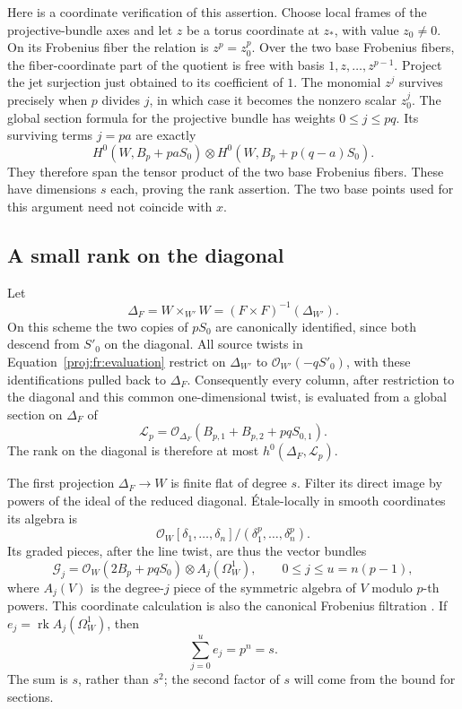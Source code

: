 \documentclass[11pt,letterpaper]{article}
\theoremstyle{definition}
\theoremstyle{remark}
\begin{document}
Here is a coordinate verification of this assertion. Choose local
frames of the projective-bundle axes and let \(z\) be a torus coordinate
at \(z_*\), with value \(z_0\ne0\). On its Frobenius fiber the relation
is \(z^p=z_0^p\). Over the two base Frobenius fibers, the fiber-coordinate
part of the quotient is free with basis \(1,z,\ldots,z^{p-1}\).
Project the jet surjection just obtained to its coefficient of \(1\).
The monomial \(z^j\) survives precisely when \(p\) divides \(j\), in
which case it becomes the nonzero scalar \(z_0^j\).
The global section formula for the projective bundle has weights
\(0\leq j\leq pq\). Its surviving terms \(j=pa\) are exactly
\[
 H^0(W,B_p+paS_0)\otimes
 H^0(W,B_p+p(q-a)S_0).
\]
They therefore span the tensor product of the two base Frobenius
fibers. These have dimensions \(s\) each, proving the rank assertion.
The two base points used for this argument need not coincide with \(x\).

\subsection{A small rank on the diagonal}

Let
\[
 \Delta_F=W\times_{W'}W=(F\times F)^{-1}(\Delta_{W'}).
\]
On this scheme the two copies of \(pS_0\) are canonically identified,
since both descend from \(S'_0\) on the diagonal. All source twists
in Equation~\eqref{proj:fr:evaluation} restrict on \(\Delta_{W'}\) to
\(\mathcal{O}_{W'}(-qS'_0)\), with these identifications pulled back to
\(\Delta_F\). Consequently every column, after restriction to
the diagonal and this common one-dimensional twist, is evaluated from a
global section on \(\Delta_F\) of
\[
 \mathcal L_p=
 \mathcal{O}_{\Delta_F}(B_{p,1}+B_{p,2}+pqS_{0,1}).
\]
The rank on the diagonal is therefore at most
\(h^0(\Delta_F,\mathcal L_p)\).

The first projection \(\Delta_F\to W\) is finite flat of degree \(s\).
Filter its direct image by powers of the ideal of the reduced
diagonal. \'{E}tale-locally in smooth coordinates its algebra is
\[
 \mathcal{O}_W[\delta_1,\ldots,\delta_n]/
                  (\delta_1^p,\ldots,\delta_n^p).
\]
Its graded pieces, after the line twist, are thus the vector bundles
\begin{equation}
\label{proj:fr:graded-pieces}
 \mathcal G_j=
 \mathcal{O}_W(2B_p+pqS_0)\otimes A_j(\Omega_W^1),
 \qquad 0\leq j\leq u=n(p-1),
\end{equation}
where \(A_j(V)\) is the degree-\(j\) piece of the symmetric algebra of
\(V\) modulo \(p\)-th powers. This coordinate calculation is also the
canonical Frobenius filtration
\cite[Theorem~3.7]{Proj-Sun2008}. If \(e_j=\operatorname{rk} A_j(\Omega_W^1)\), then
\begin{equation}
\label{proj:fr:ranks}
 \sum_{j=0}^u e_j=p^n=s.
\end{equation}
The sum is \(s\), rather than \(s^2\); the second factor of \(s\) will
come from the bound for sections.
\end{document}
